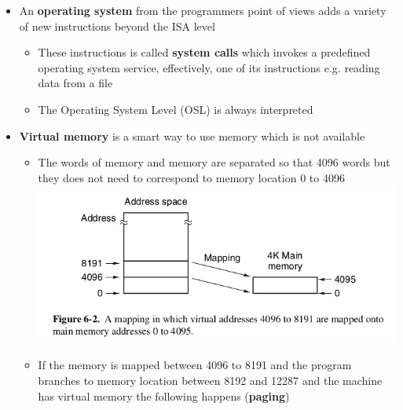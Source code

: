 \documentclass[11pt]{article}
\makeatletter
\def\maxwidth{\ifdim\Gin@nat@width>\linewidth\linewidth
    \else\Gin@nat@width\fi}
\let\Oldincludegraphics\includegraphics
\renewcommand{\includegraphics}[1]{\Oldincludegraphics[width=.8\maxwidth]{#1}}
\providecommand{\tightlist}{%
      \setlength{\itemsep}{0pt}\setlength{\parskip}{0pt}}
\makeatother
\begin{document}
\begin{itemize}
\tightlist
\item
  An \textbf{operating system} from the programmers point of views adds
  a variety of new instructions beyond the ISA level

  \begin{itemize}
  \tightlist
  \item
    These instructions is called \textbf{system calls} which invokes a
    predefined operating system service, effectively, one of its
    instructions e.g. reading data from a file
  \item
    The Operating System Level (OSL) is always interpreted
  \end{itemize}
\item
  \textbf{Virtual memory} is a smart way to use memory which is not
  available

  \begin{itemize}
  \tightlist
  \item
    The words of memory and memory are separated so that 4096 words but
    they does not need to correspond to memory location 0 to 4096
    \includegraphics{img/memory_mapping.png}
  \item
    If the memory is mapped between 4096 to 8191 and the program
    branches to memory location between 8192 and 12287 and the machine
    has virtual memory the following happens (\textbf{paging})


\end{itemize}
\end{itemize}
\end{document}
